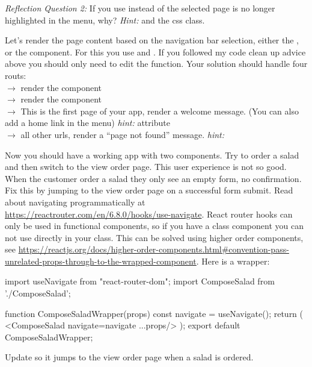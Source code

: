 \documentclass[fleqn, article, a4paper]{memoir}
\begin{document}
\begin{Assignments}
\noindent \emph{Reflection Question 2:} If you use  instead of  the selected page is no longer highlighted in the menu, why? \emph{Hint:}  and the  css class.

\item Let's render the page content based on the navigation bar selection, either the , or the  component. For this you use  and . If you followed my code clean up advice above you should only need to edit the  function. Your solution should handle four routs:
\\  $\rightarrow$ render the  component
\\  $\rightarrow$ render the  component
\\  $\rightarrow$ This is the first page of your app, render a welcome message. (You can also add a home link in the menu) \emph{hint:}  attribute
\\  $\rightarrow$ all other urls, render a ``page not found'' message. \emph{hint:} 

\item Now you should have a working app with two components. Try to order a salad and then switch to the view order page. This user experience is not so good. When the customer order a salad they only see an empty form, no confirmation. Fix this by jumping to the view order page on a successful form submit. Read about navigating programmatically at \url{https://reactrouter.com/en/6.8.0/hooks/use-navigate}. React router hooks can only be used in functional components, so if you have a class component you can not use  directly in your  class. This can be solved using higher order components, see \url{https://reactjs.org/docs/higher-order-components.html#convention-pass-unrelated-props-through-to-the-wrapped-component}. Here is a wrapper:
\begin{Code}
import { useNavigate } from "react-router-dom";
import ComposeSalad from './ComposeSalad';

function ComposeSaladWrapper(props){
  const navigate = useNavigate();
  return (
    <ComposeSalad navigate={navigate} {...props}/>
  );
}
export default ComposeSaladWrapper;
\end{Code}
\noindent Update  so it jumps to the view order page when a salad is ordered.



\end{Assignments}
\end{document}
